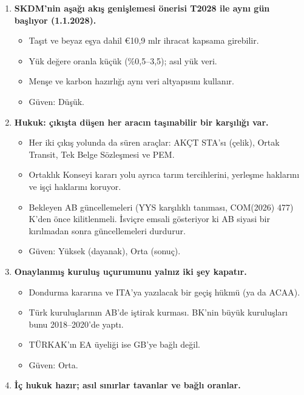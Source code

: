 \begin{enumerate}
  \begin{itemize}
  \tightlist
  \item
    Türkiye'nin varsayılan değerleri yüksek fırın düzeyinde. Çimentoya ise en kötü on ülkenin ortalaması uygulanıyor.
  \item
    AB'ye ödeme 2028'de varsayılan değerlerle €2,6 mlr, doğrulanmış verilerle €0,7 mlr.
  \item
    Yurt içi karbon fiyatı AB'ninkine eşit olur ve ücretsiz tahsis AB kurallarını aşmazsa, €0,6--1,3 mlr Türk bütçesinde kalır.
  \item
    Bu hamleler GB'den bağımsız, tam pişmanlıksız.
  \item
    \etiketT{} Güven: Orta.
  \end{itemize}
\item
  \textbf{SKDM'nin aşağı akış genişlemesi önerisi T2028 ile aynı gün başlıyor (1.1.2028).}

  \begin{itemize}
  \tightlist
  \item
    Taşıt ve beyaz eşya dahil €10,9 mlr ihracat kapsama girebilir.
  \item
    Yük değere oranla küçük (\%0,5--3,5); asıl yük veri.
  \item
    Menşe ve karbon hazırlığı aynı veri altyapısını kullanır.
  \item
    \etiketT{} Güven: Düşük.
  \end{itemize}
\item
  \textbf{Hukuk: çıkışta düşen her aracın taşınabilir bir karşılığı var.}

  \begin{itemize}
  \tightlist
  \item
    Her iki çıkış yolunda da süren araçlar: AKÇT STA'sı (çelik), Ortak Transit, Tek Belge Sözleşmesi ve PEM.
  \item
    Ortaklık Konseyi kararı yolu ayrıca tarım tercihlerini, yerleşme haklarını ve işçi haklarını koruyor.
  \item
    Bekleyen AB güncellemeleri (YYS karşılıklı tanıması, COM(2026) 477) K'den önce kilitlenmeli. İsviçre emsali gösteriyor ki AB siyasi bir kırılmadan sonra güncellemeleri durdurur.
  \item
    \etiketV{} Güven: Yüksek (dayanak), Orta (sonuç).
  \end{itemize}
\item
  \textbf{Onaylanmış kuruluş uçurumunu yalnız iki şey kapatır.}

  \begin{itemize}
  \tightlist
  \item
    Dondurma kararına ve ITA'ya yazılacak bir geçiş hükmü (ya da ACAA).
  \item
    Türk kuruluşlarının AB'de iştirak kurması. BK'nin büyük kuruluşları bunu 2018--2020'de yaptı.
  \item
    TÜRKAK'ın EA üyeliği ise GB'ye bağlı değil.
  \item
    \etiketV{} Güven: Orta.
  \end{itemize}
\item
  \textbf{İç hukuk hazır; asıl sınırlar tavanlar ve bağlı oranlar.}


\end{enumerate}
